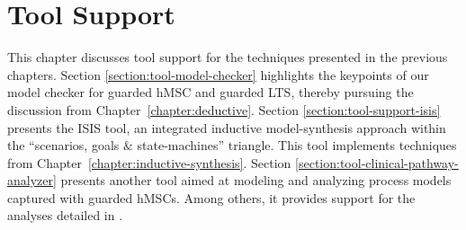 \chapter{Tool Support\label{chapter:tool-support}}

This chapter discusses tool support for the techniques presented in the previous chapters. Section \ref{section:tool-model-checker} highlights the keypoints of our model checker for guarded hMSC and guarded LTS, thereby pursuing the discussion from Chapter~\ref{chapter:deductive}. Section \ref{section:tool-support-isis} presents the ISIS tool, an integrated inductive model-synthesis approach within the ``scenarios, goals $\&$ state-machines'' triangle. This tool implements techniques from Chapter~\ref{chapter:inductive-synthesis}. Section \ref{section:tool-clinical-pathway-analyzer} presents another tool aimed at modeling and analyzing process models captured with guarded hMSCs. Among others, it provides support for the analyses detailed in \cite{Damas:2011}.





